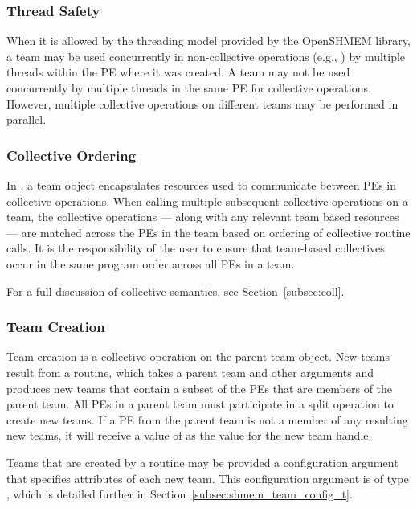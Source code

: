 \subsubsection*{Thread Safety}

When it is allowed by the threading model provided by the OpenSHMEM
library, a team may be used concurrently in non-collective operations
(e.g., ) by multiple threads within the
\ac{PE} where it was created.
A team may not be used concurrently by multiple threads in the same \ac{PE} for
collective operations. However, multiple collective operations on different
teams may be performed in parallel.

\subsubsection*{Collective Ordering}

In \openshmem, a team object encapsulates resources used to communicate
between \acp{PE} in collective operations. When calling multiple subsequent
collective operations on a team, the collective operations --- along with any
relevant team based resources --- are matched across the \acp{PE} in the team
based on ordering of collective routine calls. It is the responsibility
of the user to ensure that team-based collectives occur in the same program order
across all \acp{PE} in a team.

For a full discussion of collective semantics, see Section~\ref{subsec:coll}.

\subsubsection*{Team Creation}

Team creation is a collective operation on the parent team object. New teams
result from a  routine, which takes a parent team
and other arguments and produces new teams that contain a subset of the \acp{PE}
that are members of the parent
team. All \acp{PE} in a parent team must participate in a split operation
to create new teams. If a \ac{PE} from the parent team is not a member of any
resulting new teams, it will receive a value of 
as the value for the new team handle.

Teams that are created by a  routine may be
provided a configuration argument that specifies attributes of each new team.
This configuration argument is of type , which
is detailed further in Section~\ref{subsec:shmem_team_config_t}.

